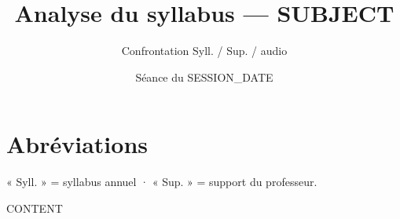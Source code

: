 \documentclass[11pt,a4paper]{ects}
\begin{document}
\title{Analyse du syllabus — {{SUBJECT}}}
\author{Confrontation Syll. / Sup. / audio}
\date{ Séance du {{SESSION_DATE}} }
\maketitle

\section*{Abréviations}
« Syll. » = syllabus annuel · « Sup. » = support du professeur.

{{CONTENT}}
\end{document}
